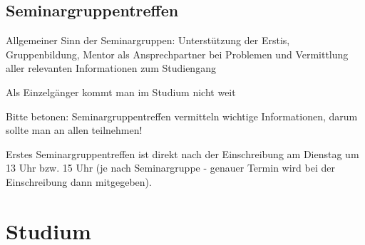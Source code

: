 \documentclass[a4paper,12pt]{report}
\begin{document}
\subsection{Seminargruppentreffen}
\begin{itemize*}
	\item Allgemeiner Sinn der Seminargruppen: Unterstützung der Erstis, Gruppenbildung, Mentor als Ansprechpartner bei Problemen und Vermittlung aller relevanten Informationen zum Studiengang
	\item \glqq Als Einzelgänger kommt man im Studium nicht weit\grqq
	\item Bitte betonen:
	Seminargruppentreffen vermitteln wichtige Informationen, darum sollte man an allen teilnehmen!
	\item Erstes Seminargruppentreffen ist direkt nach der Einschreibung am Dienstag um 13 Uhr bzw. 15 Uhr (je nach Seminargruppe - genauer Termin wird bei der Einschreibung dann mitgegeben).

\end{itemize*}

\section{Studium}
\end{document}
